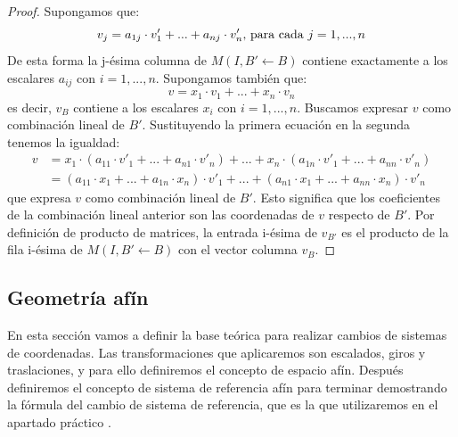 \documentclass[a4paper,11pt, oneside]{book}
\begin{document}
\begin{proof}
	Supongamos que:
	\begin{equation}
	v_j = a_{1j}\cdot v'_1 +...+ a_{nj}\cdot v'_n\textup{, para cada }j = 1,...,n
	\end{equation}
	De esta forma la j-ésima columna de $M(I, B' \leftarrow B)$  contiene exactamente a los escalares $a_{ij}$ con $i=1,...,n$. Supongamos también que:
	\begin{equation}
	v = x_1\cdot v_1+...+x_n\cdot v_n
	\end{equation}
	es decir, $v_B$ contiene a los escalares $x_i$ con $i=1,...,n$. Buscamos expresar $v$ como combinación lineal de $B'$. Sustituyendo la primera ecuación en la segunda tenemos la igualdad:
	\begin{equation}
	\begin{split}
	v &= x_1\cdot (a_{11}\cdot v'_{1}+...+a_{n1}\cdot v'_n)+...+x_n\cdot (a_{1n}\cdot v'_1+...+a_{nn}\cdot v'_n) \\
	 &= 
	 (a_{11}\cdot x_1+...+a_{1n}\cdot x_n)\cdot v'_1 +...+(a_{n1}\cdot x_1+...+a_{nn}\cdot x_n)\cdot v'_n
	 \end{split}
	\end{equation}
	que expresa $v$ como combinación lineal de $B'$. Esto significa que los coeficientes de la combinación lineal anterior son las coordenadas de $v$ respecto de $B'$. Por definición de producto de matrices, la entrada i-ésima de $v_{B'}$ es el producto de la fila i-ésima de $M(I, B' \leftarrow B)$ con el vector columna $v_B$.
\end{proof}

\subsection{Geometría afín}

En esta sección vamos a definir la base teórica para realizar cambios de sistemas de coordenadas. Las transformaciones que aplicaremos son escalados, giros y traslaciones, y para ello definiremos el concepto de espacio afín. Después definiremos el concepto de sistema de referencia afín para terminar demostrando la fórmula del cambio de sistema de referencia, que es la que utilizaremos en el apartado práctico \cite{geometria}.
\end{document}
